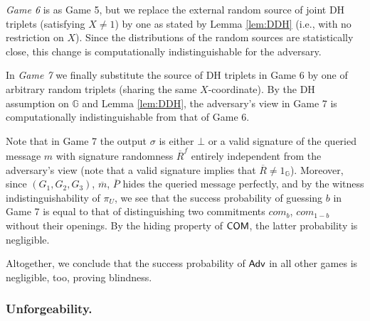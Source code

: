 \begin{description}
\item
\emph{Game 6} is as Game 5, but we replace the external random source of joint DH triplets (satisfying $X\neq 1$) by one as stated by Lemma \ref{lem:DDH} (i.e., with no restriction on $X$). 
Since the distributions of the random sources are statistically close, this change is computationally indistinguishable for the adversary. 

\item
In \emph{Game 7} we finally substitute the source of DH triplets in Game 6 by one of arbitrary random triplets (sharing the same $X$-coordinate).
By the DH assumption on $\mathbb G$ and Lemma \ref{lem:DDH}, the adversary's view in Game 7 is computationally indistinguishable from that of Game 6.
\end{description}

Note that in Game 7 the output $\sigma$ is either $\bot$ or a valid signature of the queried message $m$ with signature randomness $\overline R^{f}$ entirely independent from the adversary's view (note that a valid signature implies that $\overline R\neq 1_\mathbb{G}$).
Moreover, since $(G_1,G_2,G_3)$, $\overline m$, $\overline P$ hides the queried message perfectly, and by the witness indistinguishability of $\pi_U$, we see that the success probability of guessing $b$ in Game 7 is equal to that of distinguishing two commitments $com_b$, $com_{1-b}$ without their openings.
By the hiding property of $\operatorname{\mathsf{COM}}$, the latter probability is negligible.

Altogether, we conclude  that the success probability of $\mathsf{Adv}$ in  all other games is negligible, too, proving blindness.


\subsubsection{Unforgeability.}

